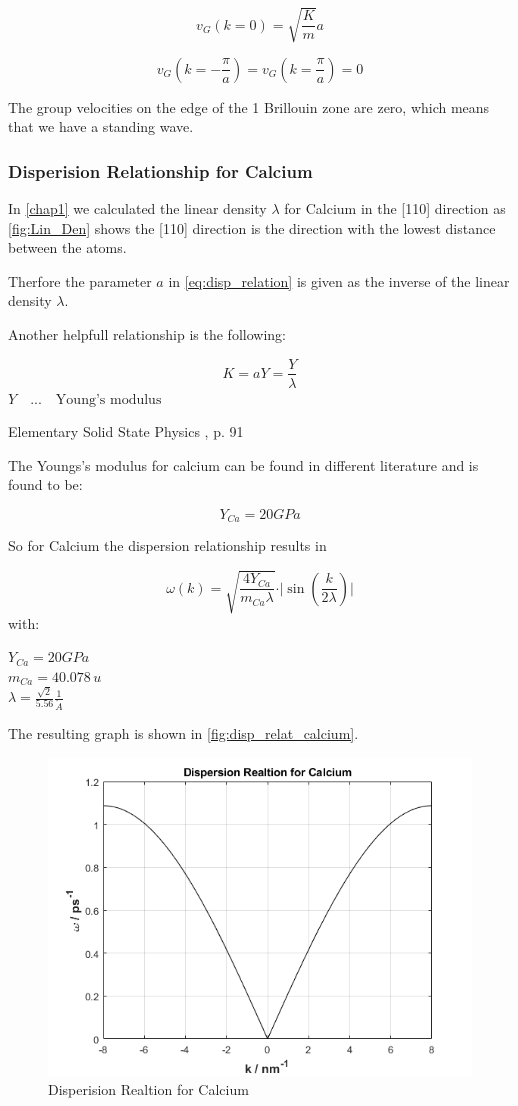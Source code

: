 $$v_G(k=0) = \sqrt{\frac{K}{m}} a$$

$$v_G\left(k=-\frac{\pi}{a}\right)= v_G\left(k=\frac{\pi}{a}\right) = 0$$

The group velocities on the edge of the 1 Brillouin zone are zero, which means that we have a standing wave.

\subsubsection*{Disperision Relationship for Calcium}

In \autoref{chap1} we calculated the linear density $\lambda$ for Calcium in the [110]
direction as \autoref{fig:Lin_Den} shows the [110] direction is the 
direction with the lowest distance between the atoms.

Therfore the parameter $a$ in \autoref{eq:disp_relation} is given as the
inverse of the linear density $\lambda$.


Another helpfull relationship is the following:

\begin{equation}
    K = aY = \frac{Y}{\lambda}
\end{equation}
$Y  \quad ... \quad \textrm{Young's modulus}$

Elementary Solid State Physics \cite{elementary_SSP}, p. 91

The Youngs's modulus for calcium can be found in different literature  \cite{web_elem_calcium} and is found to be:

$$Y_{Ca} = 20 GPa$$

So for Calcium the dispersion relationship results in 

\begin{equation}
    \omega(k) = \sqrt{\frac{4 Y_{Ca}}{m_{Ca} \lambda}} \cdot \vert \sin \left(\frac{k}{2\lambda} \right) \vert
\end{equation}
with:
\begin{addmargin}[4em]{1em}
    $Y_{Ca} = 20 GPa$\\
    $m_{Ca} = 40.078 \, u$\\
    $\lambda = \frac{\sqrt{2}}{5.56} \frac{1}{\mathring{A}}$
\end{addmargin}


The resulting graph is shown in \autoref{fig:disp_relat_calcium}.
\begin{figure}[H]
	\centering
	\includegraphics[width=0.7\linewidth]{Graphics/Chapter3/disp_relat_calcium}
	\caption{Disperision Realtion for Calcium}
	\label{fig:disp_relat_calcium}
\end{figure}

